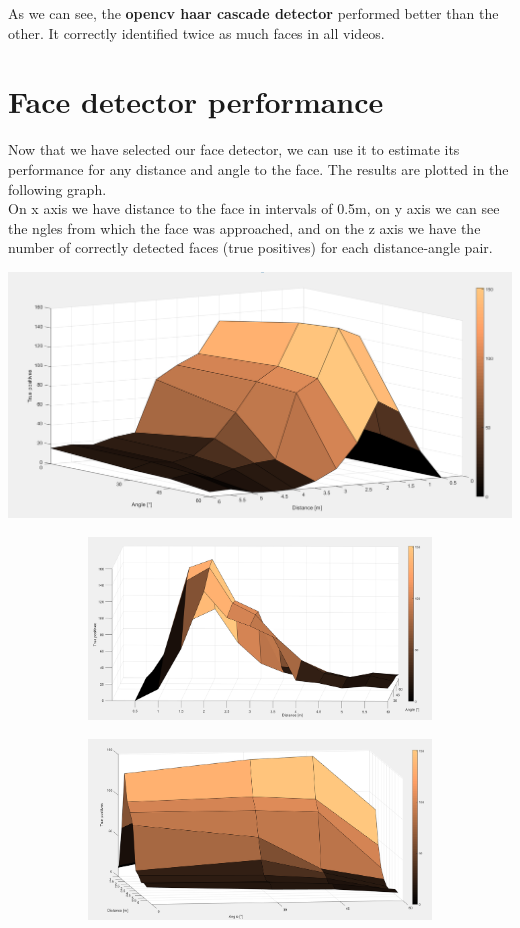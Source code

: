 \documentclass[12pt,a4paper]{report}
\begin{document}
	As we can see, the \textbf{opencv haar cascade detector} performed better than the other. It correctly identified twice as much faces in all videos. \\

	\section{Face detector performance}
	
	Now that we have selected our face detector, we can use it to estimate its performance for any distance and angle to the face. The results are plotted in the following graph. \\
	
	On x axis we have distance to the face in intervals of 0.5m, on y axis we can see the ngles from which the face was approached, and on the z axis we have the number of correctly detected faces (true positives) for each distance-angle pair. \\
	
	\begin{center}
		\includegraphics[width=.6\linewidth]{graf4}
	\end{center}
	
	\begin{figure}[H]
		\begin{subfigure}{.5\linewidth}
			\centering
			\includegraphics[width=.8\linewidth]{graf5}
		\end{subfigure}
		\begin{subfigure}{.5\linewidth}
			\centering
			\includegraphics[width=.8\linewidth]{graf6}
		\end{subfigure}
	\end{figure}
\end{document}
